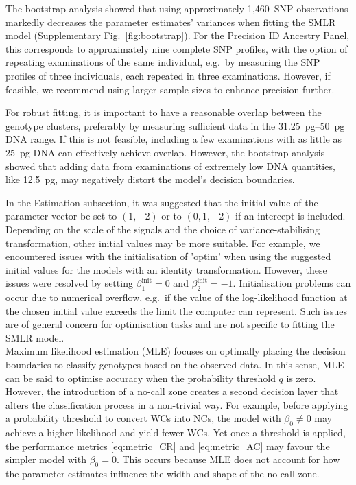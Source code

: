 \documentclass[preprint,5p,times,11pt]{elsarticle}
\begin{document}
The bootstrap analysis showed that using approximately 1,460~SNP observations markedly decreases the parameter estimates' variances when fitting the SMLR model (Supplementary Fig.~\ref{fig:bootstrap}).
For the Precision ID Ancestry Panel, this corresponds to approximately nine complete SNP profiles, with the option of repeating examinations of the same individual, e.g.~by measuring the SNP profiles of three individuals, each repeated in three examinations.
However, if feasible, we recommend using larger sample sizes to enhance precision further.

For robust fitting, it is important to have a reasonable overlap between the genotype clusters, preferably by measuring sufficient data in the \SIrange[range-units = single, range-phrase = --]{31.25}{50}{\pg} DNA range.
If this is not feasible, including a few examinations with as little as \SI{25}{\pg} DNA can effectively achieve overlap.
However, the bootstrap analysis showed that adding data from examinations of extremely low DNA quantities, like \SI{12.5}{\pg}, may negatively distort the model's decision boundaries.

In the Estimation subsection, it was suggested that the initial value of the parameter vector be set to $\left(1, -2\right)$ or to $\left(0, 1, -2\right)$ if an intercept is included.
Depending on the scale of the signals and the choice of variance-stabilising transformation, other initial values may be more suitable.
For example, we encountered issues with the initialisation of 'optim' when using the suggested initial values for the models with an identity transformation.
However, these issues were resolved by setting $\beta_1^{\text{init}} = 0$ and $\beta_2^{\text{init}} = -1$.
Initialisation problems can occur due to numerical overflow, e.g.~if the value of the log-likelihood function at the chosen initial value exceeds the limit the computer can represent.
Such issues are of general concern for optimisation tasks and are not specific to fitting the SMLR model.\\


Maximum likelihood estimation (MLE) focuses on optimally placing the decision boundaries to classify genotypes based on the observed data.
In this sense, MLE can be said to optimise accuracy when the probability threshold $q$ is zero.
However, the introduction of a no-call zone creates a second decision layer that alters the classification process in a non-trivial way.
For example, before applying a probability threshold to convert WCs into NCs, the model with $\beta_0 \neq 0$ may achieve a higher likelihood and yield fewer WCs.
Yet once a threshold is applied, the performance metrics \eqref{eq:metric_CR} and \eqref{eq:metric_AC} may favour the simpler model with $\beta_0 = 0$.
This occurs because MLE does not account for how the parameter estimates influence the width and shape of the no-call zone.
\end{document}

